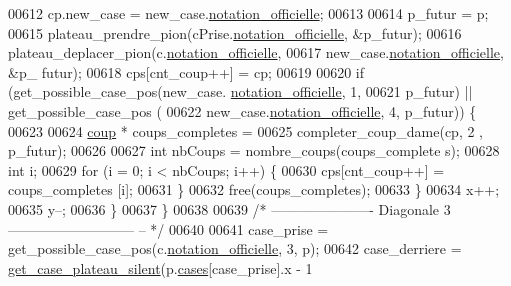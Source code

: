 \begin{DoxyCode}
00612                                 cp.new\_case = new\_case.\hyperlink{structcase__plateau_ad510581b324604a9cf685cbb769a421a}{notation_officielle};
00613 
00614                                 p\_futur = p;
00615                                 plateau\_prendre\_pion(cPrise.\hyperlink{structcase__plateau_ad510581b324604a9cf685cbb769a421a}{notation_officielle}, 
      &p\_futur);
00616                                 plateau\_deplacer\_pion(c.\hyperlink{structcase__plateau_ad510581b324604a9cf685cbb769a421a}{notation_officielle},
00617                                                 new\_case.\hyperlink{structcase__plateau_ad510581b324604a9cf685cbb769a421a}{notation_officielle}, &p\_
      futur);
00618                                 cps[cnt\_coup++] = cp;
00619 
00620                                 \textcolor{keywordflow}{if} (get\_possible\_case\_pos(new\_case.
      \hyperlink{structcase__plateau_ad510581b324604a9cf685cbb769a421a}{notation_officielle}, 1,
00621                                                 p\_futur) || get\_possible\_case\_pos
      (
00622                                                 new\_case.\hyperlink{structcase__plateau_ad510581b324604a9cf685cbb769a421a}{notation_officielle}, 4, 
      p\_futur)) \{
00623 
00624                                         \hyperlink{structcoup}{coup} * coups\_completes =
00625                                                         completer\_coup\_dame(cp, 2
      , p\_futur);
00626 
00627                                         \textcolor{keywordtype}{int} nbCoups = nombre\_coups(coups\_complete
      s);
00628                                         \textcolor{keywordtype}{int} i;
00629                                         \textcolor{keywordflow}{for} (i = 0; i < nbCoups; i++) \{
00630                                                 cps[cnt\_coup++] = coups\_completes
      [i];
00631                                         \}
00632                                         free(coups\_completes);
00633                                 \}
00634                                 x++;
00635                                 y--;
00636                         \}
00637                 \}
00638 
00639                 \textcolor{comment}{/* ---------------------- Diagonale 3 ---------------------------
      -- */}
00640 
00641                 case\_prise = get\_possible\_case\_pos(c.\hyperlink{structcase__plateau_ad510581b324604a9cf685cbb769a421a}{notation_officielle}, 3, p);
00642                 case\_derriere = \hyperlink{plateau_8h_a60a8f706865d0ae9087f8d65d4667655}{get_case_plateau_silent}(p.\hyperlink{structplateau_a6afaa60f594542e0d742b0c6d3223392}{cases}[case\_prise].x - 1

\end{DoxyCode}
